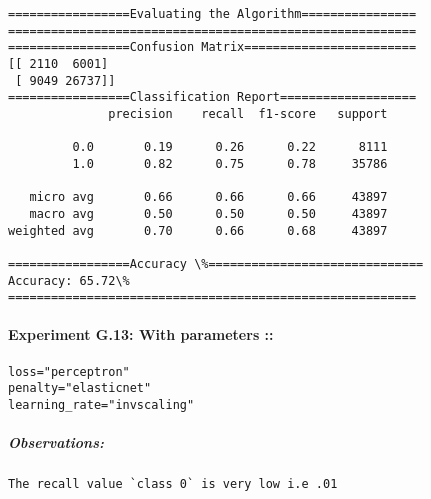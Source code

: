 \documentclass[11pt]{article}
\begin{document}
    \begin{Verbatim}[commandchars=\\\{\}]
=================Evaluating the Algorithm================
=========================================================
=================Confusion Matrix========================
[[ 2110  6001]
 [ 9049 26737]]
=================Classification Report===================
              precision    recall  f1-score   support

         0.0       0.19      0.26      0.22      8111
         1.0       0.82      0.75      0.78     35786

   micro avg       0.66      0.66      0.66     43897
   macro avg       0.50      0.50      0.50     43897
weighted avg       0.70      0.66      0.68     43897

=================Accuracy \%==============================
Accuracy: 65.72\%
=========================================================

    \end{Verbatim}

    \paragraph{Experiment G.13: With parameters
::}\label{experiment-g.13-with-parameters}

\begin{verbatim}
loss="perceptron"
penalty="elasticnet"
learning_rate="invscaling"
\end{verbatim}

\subparagraph{Observations:}\label{observations}

\begin{verbatim}
The recall value `class 0` is very low i.e .01
\end{verbatim}
\end{document}
